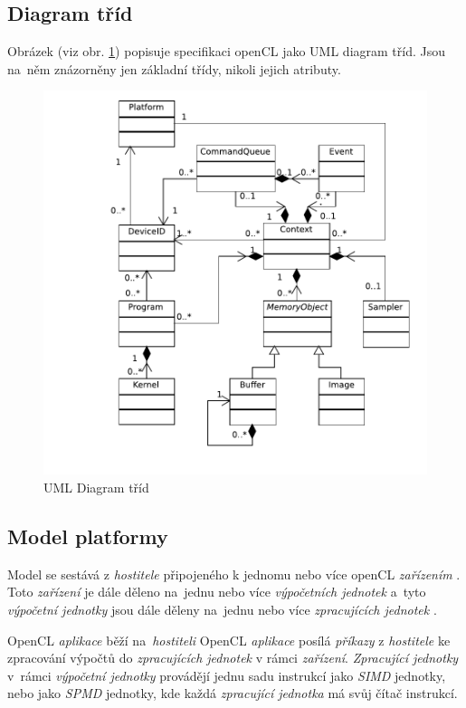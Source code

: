 \subsection{Diagram tříd}

Obrázek (viz obr. \ref{obr:openclclassdiagram}) popisuje specifikaci openCL jako UML diagram tříd.
Jsou na~něm znázorněny jen základní třídy, nikoli jejich atributy.

\begin{figure}
  \begin{center}
    \includegraphics[scale=1]{obr/ClassDiagram}
  \end{center}
  \caption{UML Diagram tříd}
  \label{obr:openclclassdiagram}
\end{figure}

\subsection{Model platformy}

Model se sestává z \emph{hostitele}  připojeného k jednomu nebo více
openCL \emph{zařízením} . Toto  \emph{zařízení} je dále děleno
na~jednu nebo více \emph{výpočetních jednotek}  a~tyto
\emph{výpočetní jednotky} jsou dále děleny na~jednu nebo více \emph{zpracujících
jednotek} .

OpenCL \emph{aplikace}  běží na~\emph{hostiteli} 
OpenCL \emph{aplikace} posílá \emph{příkazy}  z \emph{hostitele}
ke zpracování výpočtů do \emph{zpracujících jednotek} 
v rámci \emph{zařízení}. \emph{Zpracující jednotky} v~rámci \emph{výpočetní jednotky}  provádějí jednu  sadu instrukcí jako \emph{SIMD} 
 jednotky, nebo jako \emph{SPMD}  jednotky, kde každá
\emph{zpracující jednotka} má svůj čítač instrukcí.

